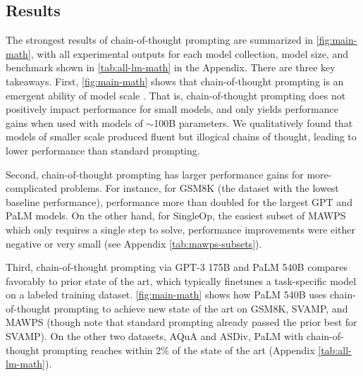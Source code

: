 \documentclass[]{article}
\theoremstyle{plain}
\theoremstyle{definition}
\theoremstyle{remark}
\newcommand{\palm}[0]{PaLM}
\begin{document}
\subsection{Results}
The strongest results of chain-of-thought prompting are summarized in \cref{fig:main-math}, with all experimental outputs for each model collection, model size, and benchmark shown in \cref{tab:all-lm-math} in the Appendix.
There are three key takeaways.
First, \cref{fig:main-math} shows that chain-of-thought prompting is an emergent ability of model scale \citep{wei2022emergent}. 
That is, chain-of-thought prompting does not positively impact performance for small models, and only yields performance gains when used with models of $\sim$100B parameters.
We qualitatively found that models of smaller scale produced fluent but illogical chains of thought, leading to lower performance than standard prompting.


Second, chain-of-thought prompting has larger performance gains for more-complicated problems. 
For instance, for GSM8K (the dataset with the lowest baseline performance), performance more than doubled for the largest GPT and \palm{} models. 
On the other hand, for SingleOp, the easiest subset of MAWPS which only requires a single step to solve, performance improvements were either negative or very small (see Appendix \cref{tab:mawps-subsets}).

Third, chain-of-thought prompting via GPT-3 175B and \palm{} 540B compares favorably to prior state of the art, which typically finetunes a task-specific model on a labeled training dataset. 
\cref{fig:main-math} shows how \palm{} 540B uses chain-of-thought prompting to achieve new state of the art on GSM8K, SVAMP, and MAWPS (though note that standard prompting already passed the prior best for SVAMP).
On the other two datasets, AQuA and ASDiv, \palm{} with chain-of-thought prompting reaches within 2\% of the state of the art (Appendix \cref{tab:all-lm-math}).
\end{document}
